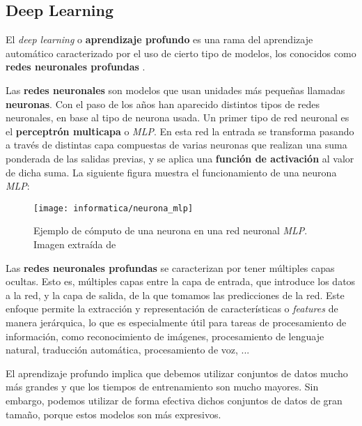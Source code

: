 \subsection{Deep Learning} \label{isubs:deep_learning_teoria}

El \textit{deep learning} o \textbf{aprendizaje profundo} es una rama del aprendizaje automático caracterizado por el uso de cierto tipo de modelos, los conocidos como \textbf{redes neuronales profundas} \cite{informatica:paper_deep_learning_def} \cite{informatica:paper_deep_learning_def_second}.

Las \textbf{redes neuronales} son modelos que usan unidades más pequeñas llamadas \textbf{neuronas}. Con el paso de los años han aparecido distintos tipos de redes neuronales, en base al tipo de neurona usada. Un primer tipo de red neuronal es el \textbf{perceptrón multicapa} o \textit{MLP}. En esta red la entrada se transforma pasando a través de distintas capa compuestas de varias neuronas que realizan una suma ponderada de las salidas previas, y se aplica una \textbf{función de activación} al valor de dicha suma. La siguiente figura muestra el funcionamiento de una neurona \textit{MLP}:

\begin{figure}[H]
    \centering
    \texttt{[image: informatica/neurona\_mlp]}
    \caption{Ejemplo de cómputo de una neurona en una red neuronal \textit{MLP}. Imagen extraída de \cite{informatica:paper_deep_learning_def}}
\end{figure}

Las \textbf{redes neuronales profundas} se caracterizan por tener múltiples capas ocultas. Esto es, múltiples capas entre la capa de entrada, que introduce los datos a la red, y la capa de salida, de la que tomamos las predicciones de la red. Este enfoque permite la extracción y representación de características o \textit{features} de manera jerárquica, lo que es especialmente útil para tareas de procesamiento de información, como reconocimiento de imágenes, procesamiento de lenguaje natural, traducción automática, procesamiento de voz, ...

El aprendizaje profundo implica que debemos utilizar conjuntos de datos mucho más grandes y que los tiempos de entrenamiento son mucho mayores. Sin embargo, podemos utilizar de forma efectiva dichos conjuntos de datos de gran tamaño, porque estos modelos son más expresivos.

